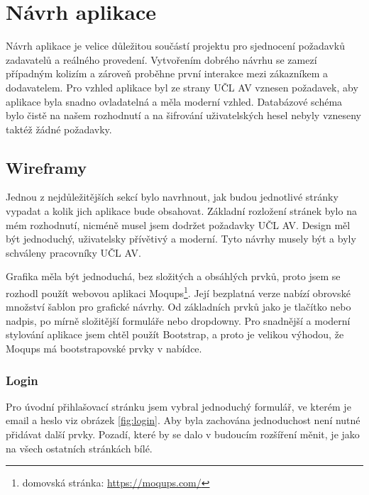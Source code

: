 \chapter{Návrh aplikace}
    Návrh aplikace je velice důležitou součástí projektu pro sjednocení požadavků zadavatelů a reálného provedení. Vytvořením dobrého návrhu se zamezí případným kolizím a zároveň proběhne první interakce mezi zákazníkem a dodavatelem. Pro vzhled aplikace byl ze strany UČL AV vznesen požadavek, aby aplikace byla snadno ovladatelná a měla moderní vzhled. Databázové schéma bylo čistě na našem rozhodnutí a na šifrování uživatelských hesel nebyly vzneseny taktéž žádné požadavky.
    
    \section{Wireframy}
        Jednou z nejdůležitějších sekcí bylo navrhnout, jak budou jednotlivé stránky vypadat a kolik jich aplikace bude obsahovat. Základní rozložení stránek bylo na mém rozhodnutí, nicméně musel jsem dodržet požadavky UČL AV. Design měl být jednoduchý, uživatelsky přívětivý a moderní. Tyto návrhy musely být a byly schváleny pracovníky UČL AV.
        
        Grafika měla být jednoduchá, bez složitých a obsáhlých prvků, proto jsem se rozhodl použít webovou aplikaci Moqups\footnote{domovská stránka: \url{https://moqups.com/}}. Její bezplatná verze nabízí obrovské množství šablon pro grafické návrhy. Od základních prvků jako je tlačítko nebo nadpis, po mírně složitější formuláře nebo dropdowny. Pro snadnější a moderní stylování aplikace jsem chtěl použít Bootstrap, a proto je velikou výhodou, že Moqups má bootstrapovské prvky v nabídce. 
        
        \subsection{Login}
            Pro úvodní přihlašovací stránku jsem vybral jednoduchý formulář, ve kterém je email a heslo viz obrázek \ref{fig:login}. Aby byla zachována jednoduchost není nutné přidávat další prvky. Pozadí, které by se dalo v budoucím rozšíření měnit, je jako na všech ostatních stránkách bílé.
            
